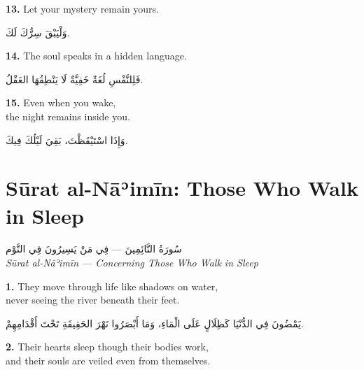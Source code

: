 \documentclass[11pt,a4paper,twoside]{book}
\begin{document}
\vspace{1em}
{\color{indigo}\bfseries 13.}\quad
Let your mystery remain yours.

\begin{flushright}
{\arabicfont
وَلْيَبْقَ سِرُّكَ لَكَ.}
\end{flushright}

\vspace{1em}
{\color{indigo}\bfseries 14.}\quad
The soul speaks in a hidden language.

\begin{flushright}
{\arabicfont
فَلِلنَّفْسِ لُغَةٌ خَفِيَّةٌ
لَا يَنْطِقُهَا العَقْلُ.}
\end{flushright}

\vspace{1em}
{\color{indigo}\bfseries 15.}\quad
Even when you wake,\\
the night remains inside you.

\begin{flushright}
{\arabicfont
وَإِذَا اسْتَيْقَظْتَ،
بَقِيَ لَيْلُكَ فِيكَ.}
\end{flushright}

\clearpage

\chapter*{Sūrat al-Nāʾimīn: Those Who Walk in Sleep}
\begin{center}
{\arabicfont\Large سُورَةُ النَّائِمِينَ — فِي مَنْ يَسِيرُونَ فِي النَّوْم}\\[5pt]
{\small\itshape Sūrat al-Nāʾimīn — Concerning Those Who Walk in Sleep}
\end{center}
\vspace{1em}

{\color{indigo}\bfseries 1.}\quad
They move through life like shadows on water,\\
never seeing the river beneath their feet.

\begin{flushright}
{\arabicfont
يَمْضُونَ فِي الدُّنْيَا كَظِلَالٍ عَلَى الْمَاءِ،
وَمَا أَبْصَرُوا نَهْرَ الحَقِيقَةِ تَحْتَ أَقْدَامِهِمْ.}
\end{flushright}

\vspace{1em}
{\color{indigo}\bfseries 2.}\quad
Their hearts sleep though their bodies work,\\
and their souls are veiled even from themselves.
\end{document}
